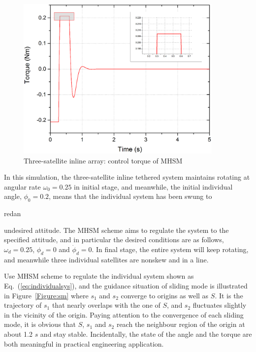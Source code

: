 \begin{figure}
\centering
\includegraphics[width=0.9\textwidth]{paper2_Fig7.eps}
\caption{Three-satellite inline array: control torque of MHSM}
\label{Figure:Torque}
\end{figure}
In this simulation, the three-satellite inline tethered system maintains rotating at angular rate $\omega_0=0.25$ in initial stage, and meanwhile, the initial individual angle, $\phi_0 = 0.2$, means that the individual system has been swung to \begin{color}{red}an\end{color} undesired attitude. The MHSM scheme aims to regulate the system to the specified attitude, and in particular the desired conditions are as follows, $\omega_d = 0.25$, $\phi_d = 0$ and $\dot{\phi}_d = 0$. In final stage, the entire system will keep rotating, and meanwhile three individual satellites are nonskew and in a line.\par
Use MHSM scheme to regulate the individual system shown as Eq.~(\ref{eq:individualsys}), and the guidance situation of sliding mode is illustrated in Figure~\ref{Figure:sm} where $s_1$ and $s_2$ converge to origins as well as $S$. It is the trajectory of $s_1$ that nearly overlaps with the one of $S$, and $s_2$ fluctuates slightly in the vicinity of the origin. Paying attention to the convergence of each sliding mode, it is obvious that $S$, $s_1$ and $s_2$ reach the neighbour region of the origin at about 1.2 $s$ and stay stable. Incidentally, the state of the angle and the torque are both meaningful in practical engineering application.\par
